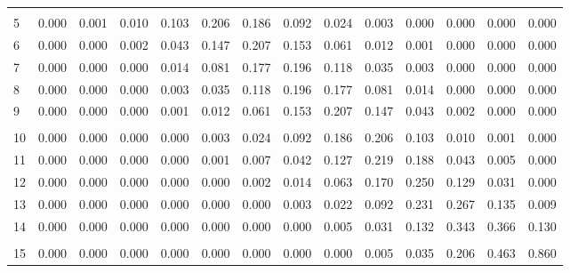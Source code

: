 \documentclass[
]{article}
\begin{document}
\begin{table}[H]
\begin{tabular}{lrrrrrrrrrrrrr}
\multicolumn{14}{l}{ }\\
\hspace{1em}5 & 0.000 & 0.001 & 0.010 & 0.103 & 0.206 & 0.186 & 0.092 & 0.024 & 0.003 & 0.000 & 0.000 & 0.000 & 0.000\\
\hspace{1em}6 & 0.000 & 0.000 & 0.002 & 0.043 & 0.147 & 0.207 & 0.153 & 0.061 & 0.012 & 0.001 & 0.000 & 0.000 & 0.000\\
\hspace{1em}7 & 0.000 & 0.000 & 0.000 & 0.014 & 0.081 & 0.177 & 0.196 & 0.118 & 0.035 & 0.003 & 0.000 & 0.000 & 0.000\\
\hspace{1em}8 & 0.000 & 0.000 & 0.000 & 0.003 & 0.035 & 0.118 & 0.196 & 0.177 & 0.081 & 0.014 & 0.000 & 0.000 & 0.000\\
\hspace{1em}9 & 0.000 & 0.000 & 0.000 & 0.001 & 0.012 & 0.061 & 0.153 & 0.207 & 0.147 & 0.043 & 0.002 & 0.000 & 0.000\\
\addlinespace[-.7em]
\multicolumn{14}{l}{ }\\
\hspace{1em}10 & 0.000 & 0.000 & 0.000 & 0.000 & 0.003 & 0.024 & 0.092 & 0.186 & 0.206 & 0.103 & 0.010 & 0.001 & 0.000\\
\hspace{1em}11 & 0.000 & 0.000 & 0.000 & 0.000 & 0.001 & 0.007 & 0.042 & 0.127 & 0.219 & 0.188 & 0.043 & 0.005 & 0.000\\
\hspace{1em}12 & 0.000 & 0.000 & 0.000 & 0.000 & 0.000 & 0.002 & 0.014 & 0.063 & 0.170 & 0.250 & 0.129 & 0.031 & 0.000\\
\hspace{1em}13 & 0.000 & 0.000 & 0.000 & 0.000 & 0.000 & 0.000 & 0.003 & 0.022 & 0.092 & 0.231 & 0.267 & 0.135 & 0.009\\
\hspace{1em}14 & 0.000 & 0.000 & 0.000 & 0.000 & 0.000 & 0.000 & 0.000 & 0.005 & 0.031 & 0.132 & 0.343 & 0.366 & 0.130\\
\addlinespace[-.7em]
\multicolumn{14}{l}{ }\\
\hspace{1em}15 & 0.000 & 0.000 & 0.000 & 0.000 & 0.000 & 0.000 & 0.000 & 0.000 & 0.005 & 0.035 & 0.206 & 0.463 & 0.860\\
\bottomrule
\end{tabular}
\end{table}
\end{document}
